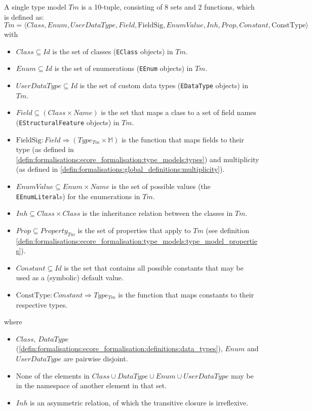 \begin{defin}
\label{defin:formalisations:ecore_formalisation:type_models:type_model}
A single type model $Tm$ is a 10-tuple, consisting of 8 sets and 2 functions, which is defined as:
\begin{equation*}
    Tm = \langle Class, Enum, UserDataType, Field, \mathrm{FieldSig}, EnumValue, Inh, Prop, Constant, \mathrm{ConstType} \rangle
\end{equation*}
with
\begin{itemize}
    \item $Class \subseteq Id$ is the set of classes (\texttt{EClass} objects) in $Tm$.
    \item $Enum \subseteq Id$ is the set of enumerations (\texttt{EEnum} objects) in $Tm$.
    \item $UserDataType \subseteq Id$ is the set of custom data types (\texttt{EDataType} objects) in $Tm$.
    \item $Field \subseteq (Class \times Name)$ is the set that maps a class to a set of field names (\texttt{EStructuralFeature} objects) in $Tm$.
    \item $\mathrm{FieldSig}: Field \Rightarrow (Type_{Tm} \times \mathbb{M})$ is the function that maps fields to their type (as defined in \cref{defin:formalisations:ecore_formalisation:type_models:types}) and multiplicity (as defined in \cref{defin:formalisations:global_definitions:multiplicity}).
    \item $EnumValue \subseteq Enum \times Name$ is the set of possible values (the \texttt{EEnumLiteral}s) for the enumerations in $Tm$.
    \item $Inh \subseteq Class \times Class$ is the inheritance relation between the classes in $Tm$.
    \item $Prop \subseteq Property_{Tm}$ is the set of properties that apply to $Tm$ (see definition \cref{defin:formalisations:ecore_formalisation:type_models:type_model_properties}).
    \item $Constant \subseteq Id$ is the set that contains all possible constants that may be used as a (symbolic) default value.
    \item $\mathrm{ConstType}: Constant \Rightarrow Type_{Tm}$ is the function that maps constants to their respective types.
\end{itemize}
where
\begin{itemize}
    \item $Class$, $DataType$ (\cref{defin:formalisations:ecore_formalisation:definitions:data_types}), $Enum$ and $UserDataType$ are pairwise disjoint.
    \item None of the elements in $Class \cup DataType \cup Enum \cup UserDataType$ may be in the namespace of another element in that set.
    \item $Inh$ is an asymmetric relation, of which the transitive closure is irreflexive.
\end{itemize}

\end{defin}


